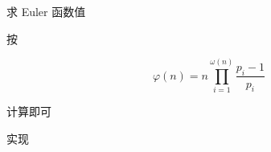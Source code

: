 \begin{frame}{求 Euler 函数值}
	\label{mulf:algo:euler-single}

	按

	\[
		\varphi(n)=n\prod_{i=1}^{\omega(n)}\frac{p_i-1}{p_i}
	\]

	计算即可
\end{frame}


\begin{frame}[fragile]{实现}
\end{frame}
